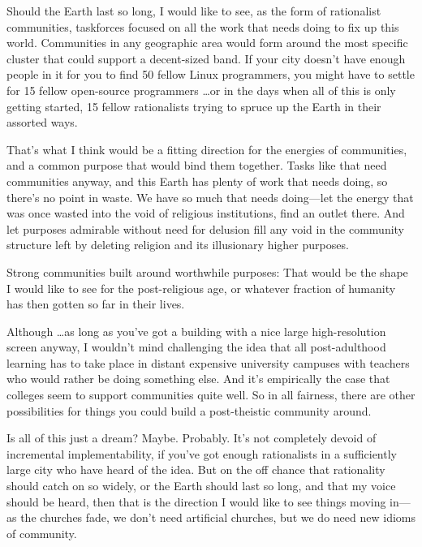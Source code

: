 {
 Should the Earth last so long, I would like to see, as the form of
rationalist communities, taskforces focused on all the work that needs
doing to fix up this world. Communities in any geographic area would
form around the most specific cluster that could support a decent-sized
band. If your city doesn't have enough people in it for
you to find 50 fellow Linux programmers, you might have to settle for
15 fellow open-source programmers \ldots or in the days when all of this
is only getting started, 15 fellow rationalists trying to spruce up the
Earth in their assorted ways.}

{
 That's what I think would be a fitting direction
for the energies of communities, and a common purpose that would bind
them together. Tasks like that need communities anyway, and this Earth
has plenty of work that needs doing, so there's no
point in waste. We have so much that needs doing---let the energy that
was once wasted into the void of religious institutions, find an outlet
there. And let purposes admirable without need for delusion fill any
void in the community structure left by deleting religion and its
illusionary higher purposes.}

{
 Strong communities built around worthwhile purposes: That would be
the shape I would like to see for the post-religious age, or whatever
fraction of humanity has then gotten so far in their lives.}

{
 Although \ldots as long as you've got a building
with a nice large high-resolution screen anyway, I
wouldn't mind challenging the idea that all
post-adulthood learning has to take place in distant expensive
university campuses with teachers who would rather be doing something
else. And it's empirically the case that colleges seem
to support communities quite well. So in all fairness, there are other
possibilities for things you could build a post-theistic community
around.}

{
 Is all of this just a dream? Maybe. Probably. It's
not completely devoid of incremental implementability, if
you've got enough rationalists in a sufficiently large
city who have heard of the idea. But on the off chance that rationality
should catch on so widely, or the Earth should last so long, and that
my voice should be heard, then that is the direction I would like to
see things moving in---as the churches fade, we don't
need artificial churches, but we do need new idioms of community.}

\myendsectiontext


